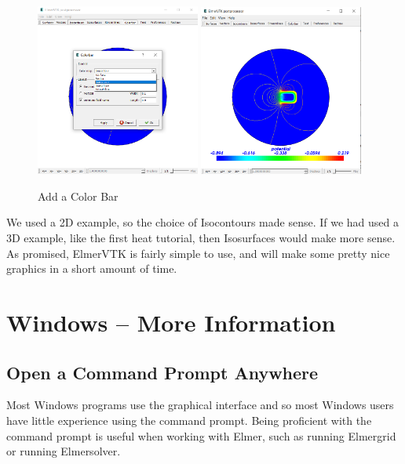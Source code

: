 \begin{figure}[H]
\begin{center}
\includegraphics[width=0.48\textwidth]{vtk-6}
\includegraphics[width=0.48\textwidth]{vtk-7}
\caption{Add a Color Bar}\label{fg:vtk-6}
\end{center}
\end{figure}

We used a 2D example, so the choice of Isocontours made sense.  If we had used a 3D example, like the first heat tutorial, then Isosurfaces would make more sense.\\

As promised, ElmerVTK is fairly simple to use, and will make some pretty nice graphics in a short amount of time.

\chapter{Windows  -- More Information}

\section{Open a Command Prompt Anywhere}

Most Windows programs use the graphical interface and so most Windows users have little experience using the command prompt.  Being proficient with the command prompt is useful when working with Elmer, such as running Elmergrid or running Elmersolver.\\

